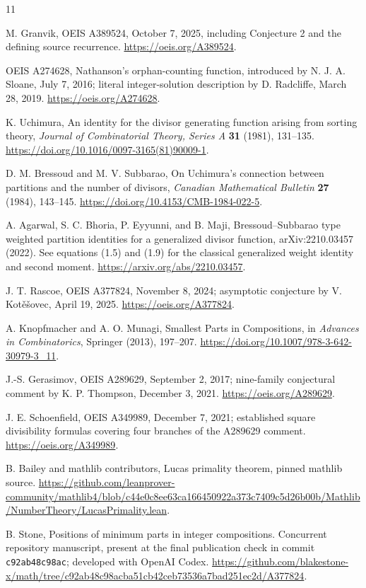 \documentclass[11pt]{article}
\begin{document}
\begin{thebibliography}{11}
\raggedright
{}
M. Granvik, OEIS A389524, October 7, 2025, including Conjecture 2 and
the defining source recurrence.
\url{https://oeis.org/A389524}.

OEIS A274628, Nathanson's orphan-counting function, introduced by
N. J. A. Sloane, July 7, 2016; literal integer-solution description
by D. Radcliffe, March 28, 2019.
\url{https://oeis.org/A274628}.

K. Uchimura, An identity for the divisor generating function arising
from sorting theory, \emph{Journal of Combinatorial Theory, Series A}
\textbf{31} (1981), 131--135.
\url{https://doi.org/10.1016/0097-3165(81)90009-1}.

D. M. Bressoud and M. V. Subbarao, On Uchimura's connection between
partitions and the number of divisors, \emph{Canadian Mathematical
Bulletin} \textbf{27} (1984), 143--145.
\url{https://doi.org/10.4153/CMB-1984-022-5}.

A. Agarwal, S. C. Bhoria, P. Eyyunni, and B. Maji,
Bressoud--Subbarao type weighted partition identities for a generalized
divisor function, arXiv:2210.03457 (2022). See equations (1.5) and (1.9)
for the classical generalized weight identity and second moment.
\url{https://arxiv.org/abs/2210.03457}.

J. T. Rascoe, OEIS A377824, November 8, 2024; asymptotic conjecture
by V. Kot\v{e}\v{s}ovec, April 19, 2025.
\url{https://oeis.org/A377824}.

A. Knopfmacher and A. O. Munagi, Smallest Parts in Compositions,
in \emph{Advances in Combinatorics}, Springer (2013), 197--207.
\url{https://doi.org/10.1007/978-3-642-30979-3_11}.

J.-S. Gerasimov, OEIS A289629, September 2, 2017; nine-family
conjectural comment by K. P. Thompson, December 3, 2021.
\url{https://oeis.org/A289629}.

J. E. Schoenfield, OEIS A349989, December 7, 2021; established square
divisibility formulas covering four branches of the A289629 comment.
\url{https://oeis.org/A349989}.

B. Bailey and mathlib contributors, Lucas primality theorem,
pinned mathlib source.
\url{https://github.com/leanprover-community/mathlib4/blob/c44e0c8ee63ca166450922a373c7409c5d26b00b/Mathlib/NumberTheory/LucasPrimality.lean}.

B. Stone, Positions of minimum parts in integer compositions.
Concurrent repository manuscript, present at the final publication check
in commit \texttt{c92ab48c98ac}; developed with OpenAI Codex.
\url{https://github.com/blakestone-x/math/tree/c92ab48c98acba51cb42ceb73536a7bad251ec2d/A377824}.
\end{thebibliography}
\end{document}
